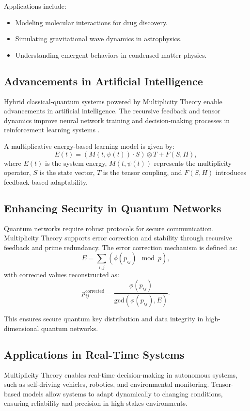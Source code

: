 \documentclass{article}
\theoremstyle{plain}
\begin{document}
Applications include:
\begin{itemize}
    \item Modeling molecular interactions for drug discovery.
    \item Simulating gravitational wave dynamics in astrophysics.
    \item Understanding emergent behaviors in condensed matter physics.
\end{itemize}

\subsection{Advancements in Artificial Intelligence}
Hybrid classical-quantum systems powered by Multiplicity Theory enable advancements in artificial intelligence. The recursive feedback and tensor dynamics improve neural network training and decision-making processes in reinforcement learning systems \cite{preskill2018quantum}.

A multiplicative energy-based learning model is given by:
\begin{equation}
E(t) = \left( M(t, \psi(t)) \cdot S \right) \otimes T + F(S, H),
\end{equation}
where $E(t)$ is the system energy, $M(t, \psi(t))$ represents the multiplicity operator, $S$ is the state vector, $T$ is the tensor coupling, and $F(S, H)$ introduces feedback-based adaptability.

\subsection{Enhancing Security in Quantum Networks}
Quantum networks require robust protocols for secure communication. Multiplicity Theory supports error correction and stability through recursive feedback and prime redundancy. The error correction mechanism is defined as:
\begin{equation}
E = \sum_{i,j} \left( \phi(p_{ij}) \mod p \right),
\end{equation}
with corrected values reconstructed as:
\begin{equation}
p_{ij}^{\text{corrected}} = \frac{\phi(p_{ij})}{\text{gcd}(\phi(p_{ij}), E)}.
\end{equation}

This ensures secure quantum key distribution and data integrity in high-dimensional quantum networks.

\subsection{Applications in Real-Time Systems}
Multiplicity Theory enables real-time decision-making in autonomous systems, such as self-driving vehicles, robotics, and environmental monitoring. Tensor-based models allow systems to adapt dynamically to changing conditions, ensuring reliability and precision in high-stakes environments.
\end{document}
